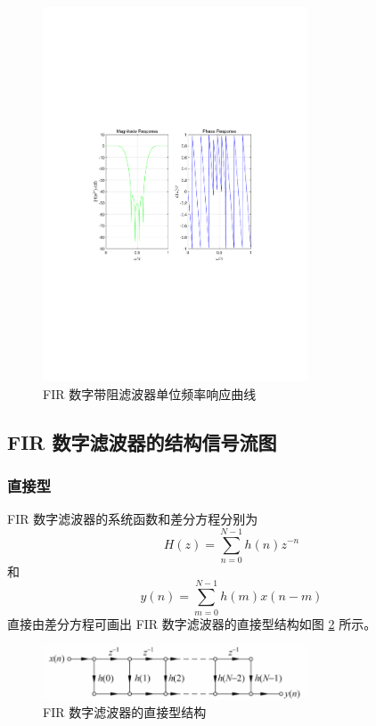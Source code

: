\documentclass[12pt,AutoFakeBold]{article}
\begin{document}
\begin{figure}[htbp]
	\centering
	\includegraphics[width=0.7\textwidth]{figure/BS2.pdf}
	\caption{FIR 数字带阻滤波器单位频率响应曲线} \label{fig:BS2}
\end{figure}

\subsection{FIR 数字滤波器的结构信号流图}

\subsubsection{直接型}

FIR 数字滤波器的系统函数和差分方程分别为
%
\begin{equation}
H(z)=\sum_{n=0}^{N-1}h(n)z^{-n}
\end{equation}
%
和
\begin{equation}
y(n)=\sum_{m=0}^{N-1}h(m)x(n-m)
\end{equation}
%
直接由差分方程可画出 FIR 数字滤波器的直接型结构如图 \ref{fig:direct} 所示。

\begin{figure}[htbp]
	\centering
	\includegraphics[width=0.7\textwidth]{figure/direct.png}
	\caption{FIR 数字滤波器的直接型结构} \label{fig:direct}
\end{figure}
\end{document}
